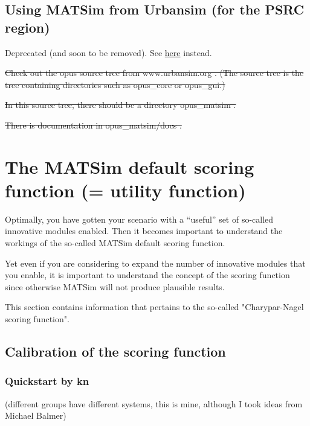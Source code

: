 \documentclass[a4paper,11pt]{report}
\begin{document}
\vfill\eject
\section{Using MATSim from Urbansim (for the PSRC region)}

Deprecated (and soon to be removed). See \href{http://matsim.org/extensions/matsim4urbansim}{here} instead.



\sout{Check  out the opus source tree from www.urbansim.org . (The source tree  is the tree containing directories such as opus\_core or opus\_gui.)}

\sout{In this source tree, there should be a directory opus\_matsim .}

\sout{There is documentation in opus\_matsim/docs .}


\chapter{The MATSim default scoring function (= utility function)}

Optimally, you have gotten your scenario with a ``useful'' set of so-called innovative modules enabled.  
%
Then it becomes important to understand the workings of the so-called MATSim default scoring function.

Yet even if you are considering to expand the number of innovative modules that you enable, it is important to understand the concept of the scoring function since otherwise MATSim will not produce plausible results.

This section contains information that pertains to the so-called "Charypar-Nagel scoring function".

\vfill\eject
\section{Calibration of the scoring function}

\subsection{Quickstart by kn}

(different groups have different systems, this is mine, although I took ideas from Michael Balmer)
\end{document}
